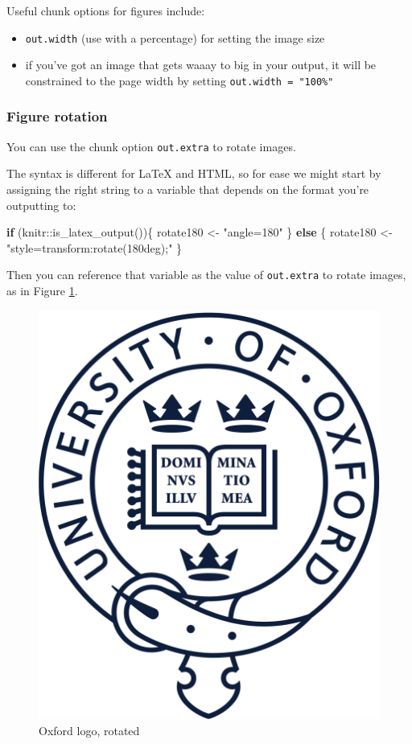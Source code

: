 \documentclass[a4paper, nobind]{templates/ociamthesis}
\providecommand{\tightlist}{%
  \setlength{\itemsep}{0pt}\setlength{\parskip}{0pt}}
\newenvironment{Shaded}{\begin{snugshade}}{\end{snugshade}}
\newcommand{\ControlFlowTok}[1]{\textcolor[rgb]{0.13,0.29,0.53}{\textbf{#1}}}
\newcommand{\FunctionTok}[1]{\textcolor[rgb]{0.00,0.00,0.00}{#1}}
\newcommand{\NormalTok}[1]{#1}
\newcommand{\OtherTok}[1]{\textcolor[rgb]{0.56,0.35,0.01}{#1}}
\newcommand{\SpecialCharTok}[1]{\textcolor[rgb]{0.00,0.00,0.00}{#1}}
\newcommand{\StringTok}[1]{\textcolor[rgb]{0.31,0.60,0.02}{#1}}
\renewenvironment{Shaded}
{
  \vspace{10pt}%
  \begin{snugshade}%
}{%
  \end{snugshade}%
  \vspace{8pt}%
}
\begin{document}
Useful chunk options for figures include:

\begin{itemize}
\tightlist
\item
  \texttt{out.width} (use with a percentage) for setting the image size
\item
  if you've got an image that gets waaay to big in your output, it will be constrained to the page width by setting \texttt{out.width\ =\ "100\%"}
\end{itemize}

\hypertarget{figure-rotation}{%
\subsubsection*{Figure rotation}\label{figure-rotation}}

You can use the chunk option \texttt{out.extra} to rotate images.

The syntax is different for LaTeX and HTML, so for ease we might start by assigning the right string to a variable that depends on the format you're outputting to:

\begin{Shaded}
\begin{Highlighting}[]
\ControlFlowTok{if}\NormalTok{ (knitr}\SpecialCharTok{::}\FunctionTok{is\_latex\_output}\NormalTok{())\{}
\NormalTok{  rotate180 }\OtherTok{\textless{}{-}} \StringTok{"angle=180"}
\NormalTok{\} }\ControlFlowTok{else}\NormalTok{ \{}
\NormalTok{  rotate180 }\OtherTok{\textless{}{-}} \StringTok{"style=\textquotesingle{}transform:rotate(180deg);\textquotesingle{}"}
\NormalTok{\}}
\end{Highlighting}
\end{Shaded}

Then you can reference that variable as the value of \texttt{out.extra} to rotate images, as in Figure \ref{fig:oxford-logo-rotated}.

\begin{figure}

{\centering \includegraphics[width=0.5\linewidth,angle=180]{figures/sample-content/beltcrest} 

}

\caption{Oxford logo, rotated}\label{fig:oxford-logo-rotated}
\end{figure}
\end{document}

